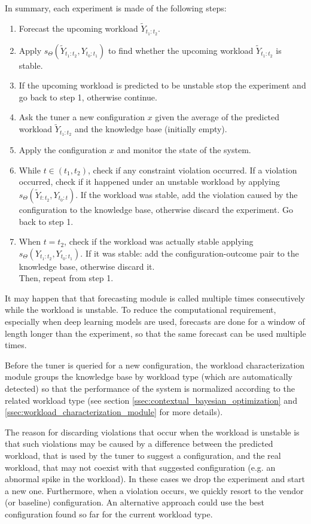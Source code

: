 \documentclass[a4paper, 12pt]{article} %
\begin{document}
	 In summary, each experiment is made of the following steps: 
	\begin{enumerate}
		\item Forecast the upcoming workload $\tilde{Y}_{t_1:t_2}$.
		\item Apply $s_\Theta(\tilde{Y}_{t_1:t_2}, Y_{t_0:t_1})$ to find whether the upcoming workload $\tilde{Y}_{t_1:t_2}$ is stable.
		\item If the upcoming workload is predicted to be unstable stop the experiment and go back to step 1, otherwise continue.
		\item Ask the tuner a new configuration $x$ given the average of the predicted workload $\tilde{Y}_{t_1:t_2}$ and the knowledge base (initially empty).
		\item Apply the configuration $x$ and monitor the state of the system.
		\item While $t \in (t_1, t_2)$, check if any constraint violation occurred. If a violation occurred, check if it happened under an unstable workload by applying $s_\Theta(\tilde{Y}_{t:t_2}, Y_{t_0:t})$. If the workload was stable, add the violation caused by the configuration to the knowledge base, otherwise discard the experiment. Go back to step 1.
		\item When $t=t_2$, check if the workload was actually stable applying\\ $s_\Theta(Y_{t_1:t_2}, Y_{t_0:t_1})$.  If it was stable: add the configuration-outcome pair to the knowledge base, otherwise discard it.\\
				  Then, repeat from step 1.
	\end{enumerate}
	It may happen that that forecasting module is called multiple times consecutively while the workload is unstable. To reduce the computational requirement, especially when deep learning models are used, forecasts are done for a window of length longer than the experiment, so that the same forecast can be used multiple times.
	
	Before the tuner is queried for a new configuration, the workload characterization module groups the knowledge base by workload type (which are automatically detected) so that the performance of the system is normalized according to the related workload type (see section \ref{ssec:contextual_bayesian_optimization} and \ref{ssec:workload_characterization_module} for more details).
	
	The reason for discarding violations that occur when the workload is unstable is that such violations may be caused by a difference between the predicted workload, that is used by the tuner to suggest a configuration, and the real workload, that may not coexist with that suggested configuration (e.g. an abnormal spike in the workload). In these cases we drop the experiment and start a new one. 
	Furthermore, when a violation occurs, we quickly resort to the vendor (or baseline) configuration. An alternative approach could use the best configuration found so far for the current workload type.
	
\end{document}
